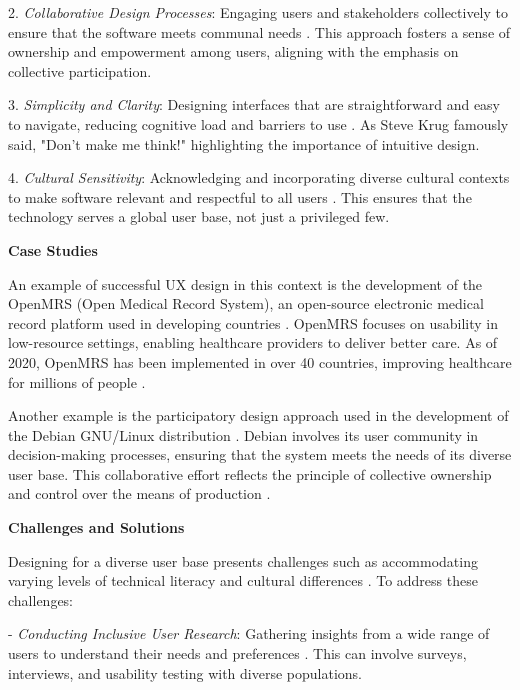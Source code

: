 \begin{refsection}
2. \textit{Collaborative Design Processes}: Engaging users and stakeholders collectively to ensure that the software meets communal needs \cite[pp.~150-152]{Greenberg2011}. This approach fosters a sense of ownership and empowerment among users, aligning with the emphasis on collective participation.

3. \textit{Simplicity and Clarity}: Designing interfaces that are straightforward and easy to navigate, reducing cognitive load and barriers to use \cite[pp.~11-13]{Krug2015}. As Steve Krug famously said, "Don't make me think!" highlighting the importance of intuitive design.

4. \textit{Cultural Sensitivity}: Acknowledging and incorporating diverse cultural contexts to make software relevant and respectful to all users \cite[pp.~46-48]{Marcus2006}. This ensures that the technology serves a global user base, not just a privileged few.

\textbf{Case Studies}

An example of successful UX design in this context is the development of the OpenMRS (Open Medical Record System), an open-source electronic medical record platform used in developing countries \cite[pp.~137-139]{Tierney2010}. OpenMRS focuses on usability in low-resource settings, enabling healthcare providers to deliver better care. As of 2020, OpenMRS has been implemented in over 40 countries, improving healthcare for millions of people \cite[pp.~15-17]{OpenMRS2020}.

Another example is the participatory design approach used in the development of the Debian GNU/Linux distribution \cite[pp.~89-91]{Coleman2013}. Debian involves its user community in decision-making processes, ensuring that the system meets the needs of its diverse user base. This collaborative effort reflects the principle of collective ownership and control over the means of production \cite[pp.~172-173]{Marx1867}.

\textbf{Challenges and Solutions}

Designing for a diverse user base presents challenges such as accommodating varying levels of technical literacy and cultural differences \cite[pp.~73-74]{Nielsen1993}. To address these challenges:

- \textit{Conducting Inclusive User Research}: Gathering insights from a wide range of users to understand their needs and preferences \cite[pp.~156-158]{Goodman2012}. This can involve surveys, interviews, and usability testing with diverse populations.


\end{refsection}
